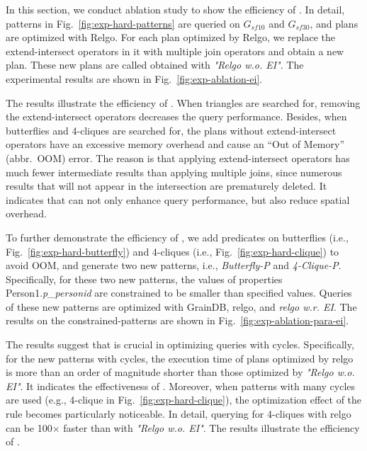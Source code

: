 In this section, we conduct ablation study to show the efficiency of \expandintersectrule.
In detail, patterns in Fig.~\ref{fig:exp-hard-patterns} are queried on $G_{sf10}$ and $G_{sf30}$, and plans are optimized with Relgo.
For each plan optimized by Relgo, we replace the extend-intersect operators in it with multiple join operators and obtain a new plan.
These new plans are called obtained with \textit{"Relgo w.o. EI"}.
The experimental results are shown in Fig.~\ref{fig:exp-ablation-ei}.

The results illustrate the efficiency of \expandintersectrule.
When triangles are searched for, removing the extend-intersect operators decreases the query performance.
Besides, when butterflies and 4-cliques are searched for, the plans without extend-intersect operators have an excessive memory overhead and cause an ``Out of Memory'' (abbr.~OOM) error.
The reason is that applying extend-intersect operators has much fewer intermediate results than applying multiple joins, since numerous results that will not appear in the intersection are prematurely deleted.
It indicates that \expandintersectrule can not only enhance query performance, but also reduce spatial overhead.

To further demonstrate the efficiency of \expandintersectrule, we add predicates on butterflies (i.e., Fig.~\ref{fig:exp-hard-butterfly}) and 4-cliques (i.e., Fig.~\ref{fig:exp-hard-clique}) to avoid OOM, and generate two new patterns, i.e., \textit{Butterfly-P} and \textit{4-Clique-P}. 
Specifically, for these two new patterns, the values of properties Person1.\textit{p\_personid} are constrained to be smaller than specified values.
Queries of these new patterns are optimized with GrainDB, relgo, and \textit{relgo w.r. EI}.
The results on the constrained-patterns are shown in Fig.~\ref{fig:exp-ablation-para-ei}.


The results suggest that \expandintersectrule is crucial in optimizing queries with cycles.
Specifically, for the new patterns with cycles, the execution time of plans optimized by relgo is more than an order of magnitude shorter than those optimized by \textit{"Relgo w.o. EI"}.
It indicates the effectiveness of \expandintersectrule.
Moreover, when patterns with many cycles are used (e.g., 4-clique in Fig.~\ref{fig:exp-hard-clique}), the optimization effect of the rule becomes particularly noticeable.
In detail, querying for 4-cliques with relgo can be 100$\times$ faster than with \textit{"Relgo w.o. EI"}.
The results illustrate the efficiency of \expandintersectrule.


